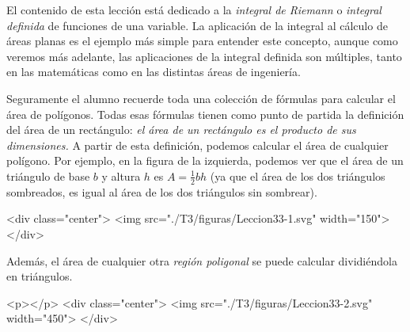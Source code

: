 El contenido de esta lección está dedicado a la \emph{integral de Riemann} o \emph{integral definida} de funciones de una variable.
La aplicación de la integral al cálculo de áreas planas es el ejemplo más simple para entender este concepto, aunque como veremos más adelante, las aplicaciones de la integral definida son múltiples, tanto en las matemáticas como en las distintas áreas de ingeniería.

\begin{latexonly}
\begin{floatingfigure}{.3\textwidth}
\begin{center}
\end{center}
\end{floatingfigure}
\end{latexonly}
Seguramente el alumno recuerde toda una colección de fórmulas para calcular el área de polígonos.
Todas esas fórmulas tienen como punto de partida la definición del área de un rectángulo: \emph{el área de un rectángulo es el producto de sus dimensiones.}
A partir de esta definición, podemos calcular el área de cualquier polígono.
Por ejemplo, en la figura de la izquierda, podemos ver que el área de  un triángulo de base $b$ y altura $h$ es
$A=\frac12bh$ (ya que el área de los dos triángulos sombreados, es igual al área de los dos triángulos sin sombrear).
\begin{rawhtml}
<div class="center">
<img src="./T3/figuras/Leccion33-1.svg" width="150">
</div>
\end{rawhtml}
Además, el área de cualquier otra \emph{región poligonal} se puede calcular dividiéndola en triángulos.
%
\begin{latexonly}
\begin{center}
\end{center}
\end{latexonly}
\begin{rawhtml}
<p></p>
<div class="center">
<img src="./T3/figuras/Leccion33-2.svg" width="450">
</div>
\end{rawhtml}

